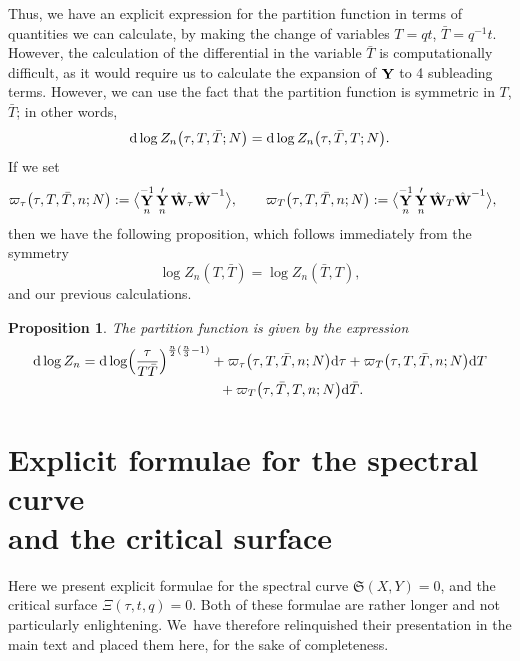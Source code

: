 \documentclass[10pt,a4paper]{amsart}
\DeclareMathOperator{\YY}{{\bf Y}}
\DeclareMathOperator{\WW}{{\bf W}}
\numberwithin{equation}{section}
\newtheorem{Proposition}[Theorem]{Proposition}
 { \theoremstyle{definition}
\newtheorem{Definition}[Theorem]{Definition}
\newtheorem{Note}[Theorem]{Note}
\newtheorem{Example}[Theorem]{Example}
\newtheorem{Remark}[Theorem]{Remark} }
\begin{document}
Thus, we have an explicit expression for the partition function in terms of quantities we can calculate, by making the change of variables $T = q t$, $\bar{T} = q^{-1} t$. However, the calculation of the differential in the variable $\bar{T}$ is computationally difficult, as it would require us to calculate the expansion of $\YY$ to 4 subleading terms. However, we can use the fact that the partition function is symmetric in $T$, $\bar{T}$; in other words,
 \begin{equation*}
 {\rm d} \log Z_n\bigl(\tau,T,\bar{T};N\bigr) = {\rm d} \log Z_n\bigl(\tau,\bar{T},T;N\bigr).
 \end{equation*}
If we set
 \begin{align*}
 &\varpi_{\tau}\bigl(\tau,T,\bar{T},n;N\bigr) := \bigl\langle \YY_n^{-1}\YY_n' \hat{\WW}_\tau \hat{\WW}^{-1}\bigr\rangle,\qquad
 \varpi_{T}\bigl(\tau,T,\bar{T},n;N\bigr) := \bigl\langle \YY_n^{-1}\YY_n' \hat{\WW}_T \hat{\WW}^{-1}\bigr\rangle,
 \end{align*}
then we have the following proposition, which follows immediately from the symmetry
\[
\log Z_n(T,\bar{T}) = \log Z_n(\bar{T},T),
\] and our previous calculations.

\begin{Proposition}
 The partition function is given by the expression
 \begin{gather*}
 {\rm d} \log Z_n = {\rm d}\log\Bigl(\frac{\tau}{T\bar{T}}\Bigr)^{\frac{n}{2}(\frac{n}{3}-1)} + \varpi_{\tau}\bigl(\tau,T,\bar{T},n;N\bigr) {\rm d}\tau +
 \varpi_{T}\bigl(\tau,T,\bar{T},n;N\bigr) {\rm d}T\\
 \hphantom{{\rm d} \log Z_n =}{}
 + \varpi_{T}\bigl(\tau,\bar{T},T,n;N\bigr) {\rm d}\bar{T}.
 \end{gather*}
\end{Proposition}

\section[Explicit formulae for the spectral curve and the critical surface]{Explicit formulae for the spectral curve \\ and the critical surface}\label{Critical-Surface-Appendix}
Here we present explicit formulae for the spectral curve $\mathfrak{S}(X,Y) = 0$, and the critical surface $\Xi(\tau,t,q) = 0$. Both of these formulae are rather longer and not particularly enlightening. We~have therefore relinquished their presentation in the main text and placed them here, for the sake of completeness.
\end{document}

